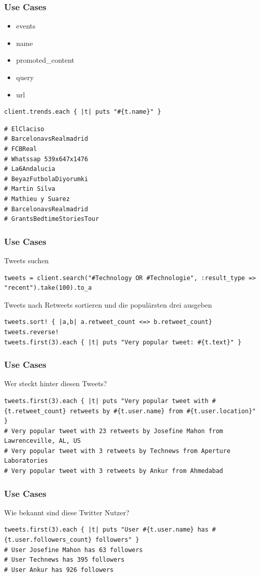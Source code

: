 \documentclass{beamer}
\begin{document}
\begin{frame}[fragile]
  \frametitle{Use Cases}
  \begin{itemize}
    \item events
    \item name
    \item promoted\_content
    \item query
    \item url
  \end{itemize}\pause
  \begin{lstlisting}
client.trends.each { |t| puts "#{t.name}" }   
  \end{lstlisting}\pause
  \begin{lstlisting}
# ElClaciso
# BarcelonavsRealmadrid
# FCBReal
# Whatssap 539x647x1476
# La6Andalucia
# BeyazFutbolaDiyorumki
# Martin Silva
# Mathieu y Suarez
# BarcelonavsRealmadrid
# GrantsBedtimeStoriesTour
  \end{lstlisting}
\end{frame}

\begin{frame}[fragile]
  \frametitle{Use Cases}
  Tweets suchen\pause
  \begin{lstlisting}
tweets = client.search("#Technology OR #Technologie", :result_type => "recent").take(100).to_a
  \end{lstlisting}\pause
  Tweets nach Retweets sortieren und die populärsten drei ausgeben\pause
  \begin{lstlisting}
tweets.sort! { |a,b| a.retweet_count <=> b.retweet_count}
tweets.reverse!
tweets.first(3).each { |t| puts "Very popular tweet: #{t.text}" }    
  \end{lstlisting}
\end{frame}

\begin{frame}[fragile]
  \frametitle{Use Cases}
Wer steckt hinter diesen Tweets?\pause
  \begin{lstlisting}
tweets.first(3).each { |t| puts "Very popular tweet with #{t.retweet_count} retweets by #{t.user.name} from #{t.user.location}" }
# Very popular tweet with 23 retweets by Josefine Mahon from Lawrenceville, AL, US
# Very popular tweet with 3 retweets by Technews from Aperture Laboratories
# Very popular tweet with 3 retweets by Ankur from Ahmedabad 
  \end{lstlisting}
\end{frame}

\begin{frame}[fragile]
  \frametitle{Use Cases}
Wie bekannt sind diese Twitter Nutzer?\pause
  \begin{lstlisting}
tweets.first(3).each { |t| puts "User #{t.user.name} has #{t.user.followers_count} followers" }
# User Josefine Mahon has 63 followers
# User Technews has 395 followers
# User Ankur has 926 followers
  \end{lstlisting}
\end{frame}
\end{document}
